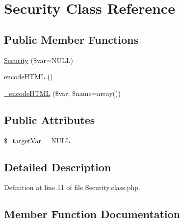 \hypertarget{classSecurity}{}\section{Security Class Reference}
\label{classSecurity}
\subsection*{Public Member Functions}
\begin{DoxyCompactItemize}
\item 
\hyperlink{classSecurity_ab74d8099e74ecc760f9328fce70760c7}{Security} (\$var=N\+U\+L\+L)
\item 
\hyperlink{classSecurity_a55da0eb544c3f7eeb6f818578fd0b393}{encode\+H\+T\+M\+L} ()
\item 
\hyperlink{classSecurity_a70d05408553b1e5d0022272d064b5085}{\+\_\+encode\+H\+T\+M\+L} (\$var, \$name=array())
\end{DoxyCompactItemize}
\subsection*{Public Attributes}
\begin{DoxyCompactItemize}
\item 
\hyperlink{classSecurity_a28ff37b08bd7a592552cf5af13f7ac74}{\$\+\_\+target\+Var} = N\+U\+L\+L
\end{DoxyCompactItemize}


\subsection{Detailed Description}


Definition at line 11 of file Security.\+class.\+php.



\subsection{Member Function Documentation}
\hypertarget{classSecurity_a70d05408553b1e5d0022272d064b5085}{}
